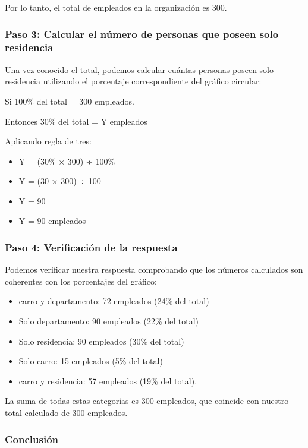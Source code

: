 \documentclass[
]{article}
\providecommand{\tightlist}{%
  \setlength{\itemsep}{0pt}\setlength{\parskip}{0pt}}
\begin{document}
Por lo tanto, el total de empleados en la organización es 300.

\subsubsection{Paso 3: Calcular el número de personas que poseen solo
residencia}\label{paso-3-calcular-el-nuxfamero-de-personas-que-poseen-solo-residencia}

Una vez conocido el total, podemos calcular cuántas personas poseen solo
residencia utilizando el porcentaje correspondiente del gráfico
circular:

Si 100\% del total = 300 empleados.

Entonces 30\% del total = Y empleados

Aplicando regla de tres:

\begin{itemize}
\tightlist
\item
  Y = (30\% × 300) ÷ 100\%
\item
  Y = (30 × 300) ÷ 100
\item
  Y = 90
\item
  Y = 90 empleados
\end{itemize}

\subsubsection{Paso 4: Verificación de la
respuesta}\label{paso-4-verificaciuxf3n-de-la-respuesta}

Podemos verificar nuestra respuesta comprobando que los números
calculados son coherentes con los porcentajes del gráfico:

\begin{itemize}
\tightlist
\item
  carro y departamento: 72 empleados (24\% del total)
\item
  Solo departamento: 90 empleados (22\% del total)
\item
  Solo residencia: 90 empleados (30\% del total)
\item
  Solo carro: 15 empleados (5\% del total)
\item
  carro y residencia: 57 empleados (19\% del total).
\end{itemize}

La suma de todas estas categorías es 300 empleados, que coincide con
nuestro total calculado de 300 empleados.

\subsubsection{Conclusión}\label{conclusiuxf3n}
\end{document}
